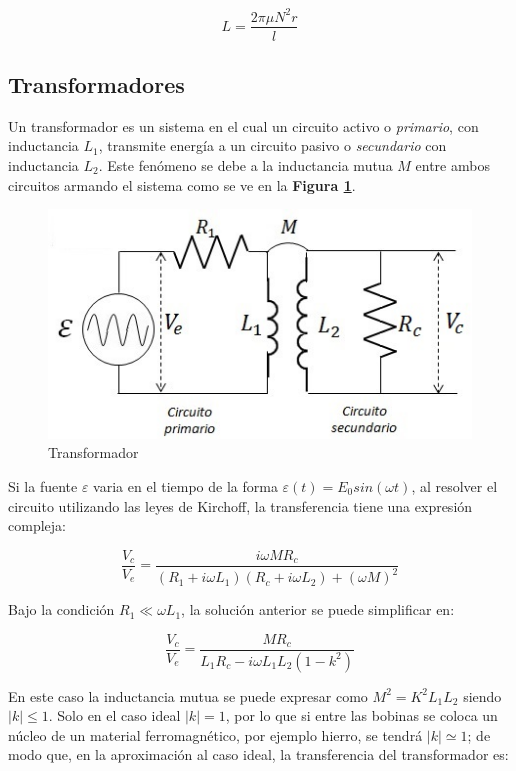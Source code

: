 \documentclass[11pt,a4paper]{article}
\begin{document}
\begin{equation}
L=\frac{2\pi\mu N^2 r}{l}
\end{equation}

\subsection{Transformadores}
Un transformador es un sistema en el cual un circuito activo o \textit{primario}, con inductancia $L_1$, transmite energía a un circuito pasivo o \textit{secundario} con inductancia $L_2$. Este fenómeno se debe a la inductancia mutua $M$ entre ambos circuitos armando el sistema como se ve en la \textbf{Figura \ref{fig:transformador}}.

\begin{figure}[h]
\centering
\includegraphics[scale=.8]{transformador.jpg}
\caption{Transformador}
\label{fig:transformador}	
\end{figure}

Si la fuente $\varepsilon$ varia en el tiempo de la forma $\varepsilon (t) = E_0 sin (\omega t)$, al resolver el circuito utilizando las leyes de Kirchoff, la transferencia tiene una expresión compleja:

\begin{equation}
\frac{V_c}{V_e}= \frac{i\omega M R_c}{(R_1 + i\omega L_1)(R_c + i\omega L_2)+ (\omega M)^2}
\label{transf_1}
\end{equation}

Bajo la condición $R_1 \ll \omega L_1$, la solución anterior se puede simplificar en:

\begin{equation}
\frac{V_c}{V_e}=\frac{MR_c}{L_1R_c-i\omega L_1L_2(1-k^2)}
\label{transf_2}
\end{equation}

En este caso la inductancia mutua se puede expresar como $M^2=K^2L_1L_2$ siendo $\vert k\vert\leq1$. Solo en el caso ideal $\vert k\vert = 1$, por lo que si entre las bobinas se coloca un núcleo de un material ferromagnético, por ejemplo hierro, se tendrá $\vert k\vert \simeq 1$; de modo que, en la aproximación al caso ideal, la transferencia del transformador es:
\end{document}
